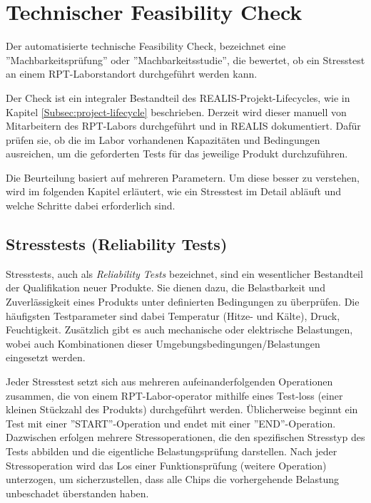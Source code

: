 \section{Technischer Feasibility Check}
Der automatisierte technische Feasibility Check, bezeichnet eine ''Machbarkeitsprüfung'' oder ''Machbarkeitsstudie'', die bewertet, ob ein Stresstest an einem \gls{RPT}-Laborstandort durchgeführt werden kann.

Der Check ist ein integraler Bestandteil des \gls{REALIS}-Projekt-Lifecycles, wie in Kapitel \ref{Subsec:project-lifecycle} beschrieben. Derzeit wird dieser manuell von Mitarbeitern des \gls{RPT}-Labors durchgeführt und in \gls{REALIS} dokumentiert. Dafür prüfen sie, ob die im Labor vorhandenen Kapazitäten und Bedingungen ausreichen, um die geforderten Tests für das jeweilige Produkt durchzuführen.

Die Beurteilung basiert auf mehreren Parametern. Um diese besser zu verstehen, wird im folgenden Kapitel erläutert, wie ein Stresstest im Detail abläuft und welche Schritte dabei erforderlich sind.


\subsection{Stresstests (Reliability Tests)}

Stresstests, auch als \textit{Reliability Tests} bezeichnet, sind ein wesentlicher Bestandteil der Qualifikation neuer Produkte. Sie dienen dazu, die Belastbarkeit und Zuverlässigkeit eines Produkts unter definierten Bedingungen zu überprüfen. Die häufigsten Testparameter sind dabei Temperatur (Hitze- und Kälte), Druck, Feuchtigkeit. Zusätzlich gibt es auch mechanische oder elektrische Belastungen, wobei auch Kombinationen dieser Umgebungsbedingungen/Belastungen eingesetzt werden.

Jeder Stresstest setzt sich aus mehreren aufeinanderfolgenden Operationen zusammen, die von einem \gls{RPT}-Labor-\gls{operator} mithilfe eines Test-\glspl{los} (einer kleinen Stückzahl des Produkts) durchgeführt werden. Üblicherweise beginnt ein Test mit einer ''START''-Operation und endet mit einer ''END''-Operation. Dazwischen erfolgen mehrere Stressoperationen, die den spezifischen Stresstyp des Tests abbilden und die eigentliche Belastungsprüfung darstellen. Nach jeder Stressoperation wird das Los einer Funktionsprüfung (weitere Operation) unterzogen, um sicherzustellen, dass alle Chips die vorhergehende Belastung unbeschadet überstanden haben.

